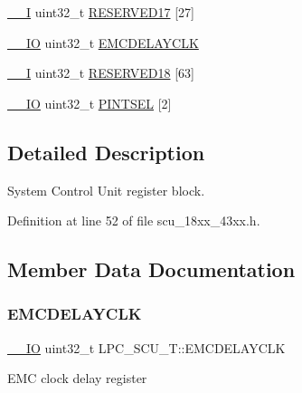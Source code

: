 \begin{DoxyCompactItemize}
\hyperlink{core__sc300_8h_af63697ed9952cc71e1225efe205f6cd3}{\+\_\+\+\_\+I} uint32\+\_\+t \hyperlink{struct_l_p_c___s_c_u___t_af1c12a9755029ed11f620e8013a1a05b}{R\+E\+S\+E\+R\+V\+E\+D17} \mbox{[}27\mbox{]}
\item 
\hyperlink{core__sc300_8h_aec43007d9998a0a0e01faede4133d6be}{\+\_\+\+\_\+\+IO} uint32\+\_\+t \hyperlink{struct_l_p_c___s_c_u___t_ae77c57655b888a13c55453a47a3ac143}{E\+M\+C\+D\+E\+L\+A\+Y\+C\+LK}
\item 
\hyperlink{core__sc300_8h_af63697ed9952cc71e1225efe205f6cd3}{\+\_\+\+\_\+I} uint32\+\_\+t \hyperlink{struct_l_p_c___s_c_u___t_a1cfac41fcc98c2e5c9f1940af7f8dd72}{R\+E\+S\+E\+R\+V\+E\+D18} \mbox{[}63\mbox{]}
\item 
\hyperlink{core__sc300_8h_aec43007d9998a0a0e01faede4133d6be}{\+\_\+\+\_\+\+IO} uint32\+\_\+t \hyperlink{struct_l_p_c___s_c_u___t_aaa33b2f1501271218162c882373372a7}{P\+I\+N\+T\+S\+EL} \mbox{[}2\mbox{]}
\end{DoxyCompactItemize}


\subsection{Detailed Description}
System Control Unit register block. 

Definition at line 52 of file scu\+\_\+18xx\+\_\+43xx.\+h.



\subsection{Member Data Documentation}
\mbox{\label{struct_l_p_c___s_c_u___t_ae77c57655b888a13c55453a47a3ac143}} 
\subsubsection{\texorpdfstring{E\+M\+C\+D\+E\+L\+A\+Y\+C\+LK}{EMCDELAYCLK}}
{\footnotesize\ttfamily \hyperlink{core__sc300_8h_aec43007d9998a0a0e01faede4133d6be}{\+\_\+\+\_\+\+IO} uint32\+\_\+t L\+P\+C\+\_\+\+S\+C\+U\+\_\+\+T\+::\+E\+M\+C\+D\+E\+L\+A\+Y\+C\+LK}

E\+MC clock delay register 

